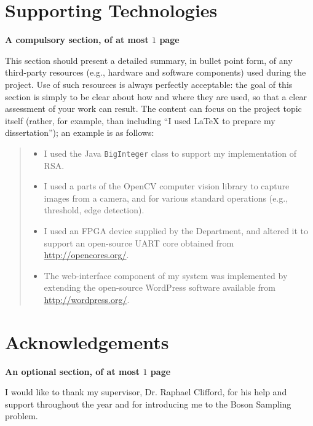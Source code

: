 \documentclass[ %
                    author={Manan Vaswani},
                supervisor={Dr. Raphael Clifford},
                    degree={MEng},
                     title={A multi-core CPU implementation \n of the classical Boson Sampling algorithm},
                  subtitle={},
                      type={},
                      year={2019} ]{dissertation}
\begin{document}
\chapter*{Supporting Technologies}

{\bf A compulsory section, of at most $1$ page}
\vspace{1cm} 

\noindent
This section should present a detailed summary, in bullet point form, 
of any third-party resources (e.g., hardware and software components) 
used during the project.  Use of such resources is always perfectly 
acceptable: the goal of this section is simply to be clear about how
and where they are used, so that a clear assessment of your work can
result.  The content can focus on the project topic itself (rather,
for example, than including ``I used \mbox{\LaTeX} to prepare my 
dissertation''); an example is as follows:

\begin{quote}
\noindent
\begin{itemize}
\item I used the Java {\tt BigInteger} class to support my implementation 
      of RSA.
\item I used a parts of the OpenCV computer vision library to capture 
      images from a camera, and for various standard operations (e.g., 
      threshold, edge detection).
\item I used an FPGA device supplied by the Department, and altered it 
      to support an open-source UART core obtained from 
      \url{http://opencores.org/}.
\item The web-interface component of my system was implemented by 
      extending the open-source WordPress software available from
      \url{http://wordpress.org/}.
\end{itemize}
\end{quote}


\chapter*{Acknowledgements}

{\bf An optional section, of at most $1$ page}
\vspace{1cm} 

\noindent
I would like to thank my supervisor, Dr. Raphael Clifford, for his help and support throughout the year and for introducing me to the Boson Sampling problem.
\end{document}
